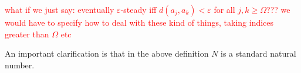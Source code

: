 \textcolor{red}{what if we just say: eventually $\varepsilon$-steady iff $d(a_j,a_k)<\varepsilon$ for all $j,k \geq \Omega$??? we would have to specify how to deal with these kind of things, taking indices greater than $\Omega$ etc}


\medskip

An important clarification is that in the above definition $N$ is a standard natural number.  

